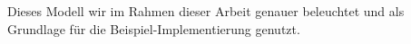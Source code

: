 Dieses Modell wir im Rahmen dieser Arbeit genauer beleuchtet und als Grundlage für die Beispiel-Implementierung genutzt.

\begin{comment}
	\subsection{Probabilistische Ansätze}
	Probabilistische Ansätze basieren auf Wahrscheinlichkeiten. Hierbei wird eine Abschätzung der Wahrscheinlichkeit berechnet, mit der ein Dokument $d$ bezüglich einer Anfrage $q$ relevant ist \cite{IR_Uni_Duisburg}. Zur Abschätzung der Wahrscheinlichkeit gibt es verschiedene Ansätze, die hier jedoch nicht weiter thematisiert werden. Bei allen praktisch nutzbaren Ansätzen sind jedoch eine - je nach Ansatz - große oder kleine Menge von Zusatzinformationen über die Dokumentenkollektion nötig \cite{IR_Uni_Duisburg}.
\end{comment}